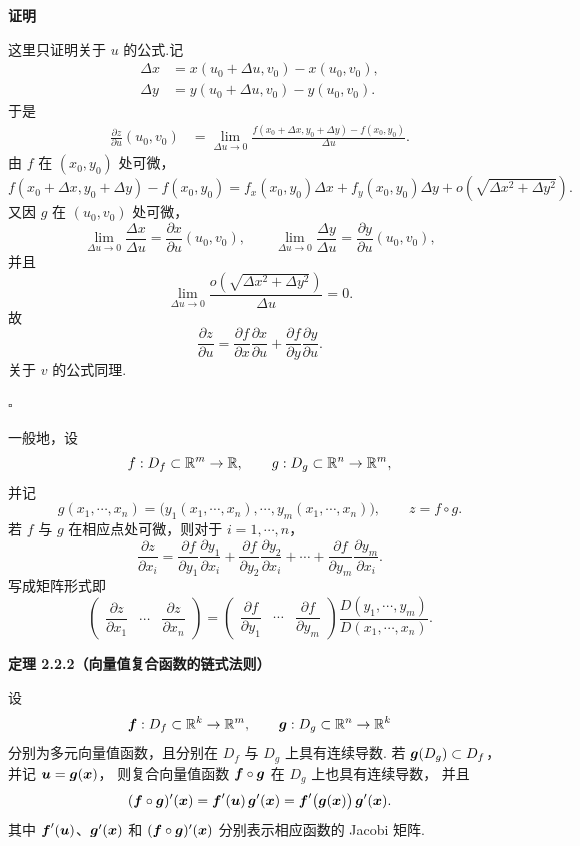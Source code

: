 \textbf{证明}

这里只证明关于 $u$ 的公式.记
	\[
	\begin{aligned}
	\Delta x&=x(u_0+\Delta u,v_0)-x(u_0,v_0),\\
	\Delta y&=y(u_0+\Delta u,v_0)-y(u_0,v_0).
	\end{aligned}
	\]
	于是
	\[
	\begin{aligned}
	\frac{\partial z}{\partial u}(u_0,v_0)
	&=
	\lim_{\Delta u\to0}
	\frac{
	f(x_0+\Delta x,y_0+\Delta y)-f(x_0,y_0)}
	{\Delta u}.
	\end{aligned}
	\]
	由 $f$ 在 $(x_0,y_0)$ 处可微，
	\[
	f(x_0+\Delta x,y_0+\Delta y)-f(x_0,y_0)
	=
	f_x(x_0,y_0)\Delta x
	+
	f_y(x_0,y_0)\Delta y
	+
	o\left(\sqrt{\Delta x^2+\Delta y^2}\right).
	\]
	又因 $g$ 在 $(u_0,v_0)$ 处可微，
	\[
	\lim_{\Delta u\to0}\frac{\Delta x}{\Delta u}
	=
	\frac{\partial x}{\partial u}(u_0,v_0),
	\qquad
	\lim_{\Delta u\to0}\frac{\Delta y}{\Delta u}
	=
	\frac{\partial y}{\partial u}(u_0,v_0),
	\]
	并且
	\[
	\lim_{\Delta u\to0}
	\frac{o\left(\sqrt{\Delta x^2+\Delta y^2}\right)}
	{\Delta u}=0.
	\]
	故
	\[
	\frac{\partial z}{\partial u}
	=
	\frac{\partial f}{\partial x}\frac{\partial x}{\partial u}
	+
	\frac{\partial f}{\partial y}\frac{\partial y}{\partial u}.
	\]
	关于 $v$ 的公式同理.


$\square$



一般地，设
\[
f:D_f\subset\mathbb{R}^m\to\mathbb{R},
\qquad
g:D_g\subset\mathbb{R}^n\to\mathbb{R}^m,
\]
并记
\[
g(x_1,\cdots,x_n)
=
\bigl(y_1(x_1,\cdots,x_n),\cdots,y_m(x_1,\cdots,x_n)\bigr),
\qquad
z=f\circ g.
\]
若 $f$ 与 $g$ 在相应点处可微，则对于 $i=1,\cdots,n$，
\[
\frac{\partial z}{\partial x_i}
=
\frac{\partial f}{\partial y_1}\frac{\partial y_1}{\partial x_i}
+
\frac{\partial f}{\partial y_2}\frac{\partial y_2}{\partial x_i}
+\cdots+
\frac{\partial f}{\partial y_m}\frac{\partial y_m}{\partial x_i}.
\]
写成矩阵形式即
\[
\begin{pmatrix}
\dfrac{\partial z}{\partial x_1}
&\cdots&
\dfrac{\partial z}{\partial x_n}
\end{pmatrix}
=
\begin{pmatrix}
\dfrac{\partial f}{\partial y_1}
&\cdots&
\dfrac{\partial f}{\partial y_m}
\end{pmatrix}
\frac{D(y_1,\cdots,y_m)}
{D(x_1,\cdots,x_n)}.
\]



\textbf{定理 2.2.2（向量值复合函数的链式法则）}


	设
	\[
	\boldsymbol{f}:D_f\subset\mathbb{R}^k\to\mathbb{R}^m,
	\qquad
	\boldsymbol{g}:D_g\subset\mathbb{R}^n\to\mathbb{R}^k
	\]
	分别为多元向量值函数，且分别在 $D_f$ 与 $D_g$ 上具有连续导数.
	若 $\boldsymbol{g}(D_g)\subset D_f$，并记 $\boldsymbol{u}=\boldsymbol{g}(\boldsymbol{x})$，
	则复合向量值函数 $\boldsymbol{f}\circ\boldsymbol{g}$ 在 $D_g$ 上也具有连续导数，
	并且
	\[
	(\boldsymbol{f}\circ\boldsymbol{g})'(\boldsymbol{x})
	=
	\boldsymbol{f}'(\boldsymbol{u})\,\boldsymbol{g}'(\boldsymbol{x})
	=
	\boldsymbol{f}'\bigl(\boldsymbol{g}(\boldsymbol{x})\bigr)\,\boldsymbol{g}'(\boldsymbol{x}).
	\]
	其中 $\boldsymbol{f}'(\boldsymbol{u})$、$\boldsymbol{g}'(\boldsymbol{x})$ 和
	$(\boldsymbol{f}\circ\boldsymbol{g})'(\boldsymbol{x})$ 分别表示相应函数的 Jacobi 矩阵.




